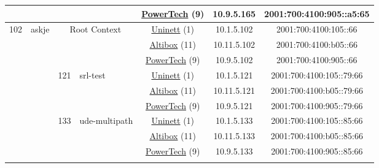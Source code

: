 \begin{small}
\begin{center}
\begin{longtable}{|c|c|c|c|c|c|c|c|}
  &  &  &  & \multicolumn{2}{|c|}{\tiny{\href{http://www.powertech.no}{PowerTech} (9)}} & \tiny{10.9.5.165} & \tiny{2001:700:4100:905::a5:65} \\ \hline
 \multirow{27}{*}{\tiny{102}} & \multicolumn{1}{|l|}{\multirow{27}{*}{\tiny{askje}}} & \multicolumn{2}{|c|}{\multirow{3}{*}{\tiny{Root Context}}} & \multicolumn{2}{|c|}{\tiny{\href{https://www.uninett.no}{Uninett} (1)}} & \tiny{10.1.5.102} & \tiny{2001:700:4100:105::66} \\* \cline{5-5}\cline{6-6}\cline{7-7}\cline{8-8}
  &  & \multicolumn{2}{|c|}{} & \multicolumn{2}{|c|}{\tiny{\href{https://www.altibox.no}{Altibox} (11)}} & \tiny{10.11.5.102} & \tiny{2001:700:4100:b05::66} \\* \cline{5-5}\cline{6-6}\cline{7-7}\cline{8-8}
  &  & \multicolumn{2}{|c|}{} & \multicolumn{2}{|c|}{\tiny{\href{http://www.powertech.no}{PowerTech} (9)}} & \tiny{10.9.5.102} & \tiny{2001:700:4100:905::66} \\* \cline{3-3}\cline{4-4}\cline{5-5}\cline{6-6}\cline{7-7}\cline{8-8}
  &  & \multirow{3}{*}{\tiny{121}} & \multicolumn{1}{|l|}{\multirow{3}{*}{\tiny{srl-test}}} & \multicolumn{2}{|c|}{\tiny{\href{https://www.uninett.no}{Uninett} (1)}} & \tiny{10.1.5.121} & \tiny{2001:700:4100:105::79:66} \\* \cline{5-5}\cline{6-6}\cline{7-7}\cline{8-8}
  &  &  &  & \multicolumn{2}{|c|}{\tiny{\href{https://www.altibox.no}{Altibox} (11)}} & \tiny{10.11.5.121} & \tiny{2001:700:4100:b05::79:66} \\* \cline{5-5}\cline{6-6}\cline{7-7}\cline{8-8}
  &  &  &  & \multicolumn{2}{|c|}{\tiny{\href{http://www.powertech.no}{PowerTech} (9)}} & \tiny{10.9.5.121} & \tiny{2001:700:4100:905::79:66} \\* \cline{3-3}\cline{4-4}\cline{5-5}\cline{6-6}\cline{7-7}\cline{8-8}
  &  & \multirow{3}{*}{\tiny{133}} & \multicolumn{1}{|l|}{\multirow{3}{*}{\tiny{ude-multipath}}} & \multicolumn{2}{|c|}{\tiny{\href{https://www.uninett.no}{Uninett} (1)}} & \tiny{10.1.5.133} & \tiny{2001:700:4100:105::85:66} \\* \cline{5-5}\cline{6-6}\cline{7-7}\cline{8-8}
  &  &  &  & \multicolumn{2}{|c|}{\tiny{\href{https://www.altibox.no}{Altibox} (11)}} & \tiny{10.11.5.133} & \tiny{2001:700:4100:b05::85:66} \\* \cline{5-5}\cline{6-6}\cline{7-7}\cline{8-8}
  &  &  &  & \multicolumn{2}{|c|}{\tiny{\href{http://www.powertech.no}{PowerTech} (9)}} & \tiny{10.9.5.133} & \tiny{2001:700:4100:905::85:66} \\* \cline{3-3}\cline{4-4}\cline{5-5}\cline{6-6}\cline{7-7}\cline{8-8}

\end{longtable}
\end{center}
\end{small}
